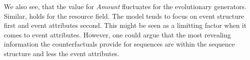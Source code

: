 \documentclass[./../../paper.tex]{subfiles}
\begin{document}




%     
    
%     
    

We also see, that the value for \emph{Amount} fluctuates for the evolutionary generators. Similar, holds for the resource field. The model tends to focus on event structure first and event attributes second. This might be seen as a limitting factor when it comes to event attributes. However, one could argue that the most revealing information the counterfactuals provide for sequences are within the sequence structure and less the event attributes. 





\end{document}
